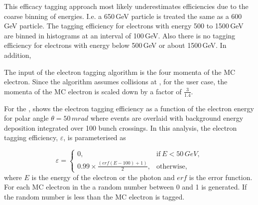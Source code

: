 This efficacy tagging approach  most likely underestimates efficiencies due to the coarse binning of energies. I.e. a 650\,GeV particle is treated the same as a 600\,GeV particle. The tagging efficiency for electrons with energy 500 to 1500\,GeV are binned in histograms at an interval of 100\,GeV. Also there is no tagging efficiency for electrons with energy below 500\,GeV or about 1500\,GeV. In addition,



The input of the \BeamCAL electron tagging algorithm is the four momenta of the MC electron. Since the algorithm assumes collisions at , for the  user case, the momenta of the MC electron is scaled down by a factor of $\frac{3}{1.4}$.



For the \LumiCAL,   shows the \LumiCAL  electron tagging efficiency as a function of the electron energy for polar angle $\theta = 50\,mrad$ where events are overlaid with background energy deposition integrated over 100 bunch crossings. In this analysis, the \LumiCAL electron tagging efficiency, $\varepsilon$, is parameterised as




\begin{equation}
\varepsilon=
\begin{cases}
  0, & \text{if}\ E < 50\,GeV,\\
  0.99 \times \frac{(erf(E - 100) + 1 )}{2}, & \text{otherwise},
\end{cases}
\end{equation}
where $E$ is the energy of the electron or the photon and $erf$ is the error function. For each MC electron in the \LumiCAL a random number between 0 and 1 is generated. If the random number is less than \varepsilon the MC electron is tagged.

